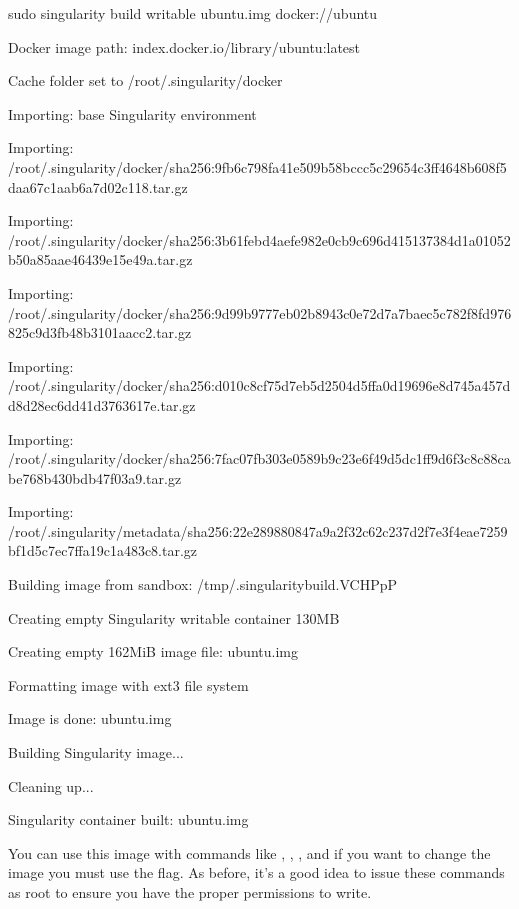 \documentclass[letterpaper,10pt,english]{sphinxmanual}
\begin{document}
%
\begin{sphinxVerbatim}[commandchars=\\\{\}]
\PYGZdl{} sudo singularity build \PYGZhy{}\PYGZhy{}writable ubuntu.img docker://ubuntu

Docker image path: index.docker.io/library/ubuntu:latest

Cache folder set to /root/.singularity/docker

Importing: base Singularity environment

Importing: /root/.singularity/docker/sha256:9fb6c798fa41e509b58bccc5c29654c3ff4648b608f5daa67c1aab6a7d02c118.tar.gz

Importing: /root/.singularity/docker/sha256:3b61febd4aefe982e0cb9c696d415137384d1a01052b50a85aae46439e15e49a.tar.gz

Importing: /root/.singularity/docker/sha256:9d99b9777eb02b8943c0e72d7a7baec5c782f8fd976825c9d3fb48b3101aacc2.tar.gz

Importing: /root/.singularity/docker/sha256:d010c8cf75d7eb5d2504d5ffa0d19696e8d745a457dd8d28ec6dd41d3763617e.tar.gz

Importing: /root/.singularity/docker/sha256:7fac07fb303e0589b9c23e6f49d5dc1ff9d6f3c8c88cabe768b430bdb47f03a9.tar.gz

Importing: /root/.singularity/metadata/sha256:22e289880847a9a2f32c62c237d2f7e3f4eae7259bf1d5c7ec7ffa19c1a483c8.tar.gz

Building image from sandbox: /tmp/.singularity\PYGZhy{}build.VCHPpP

Creating empty Singularity writable container 130MB

Creating empty 162MiB image file: ubuntu.img

Formatting image with ext3 file system

Image is done: ubuntu.img

Building Singularity image...


Cleaning up...


Singularity container built: ubuntu.img
\end{sphinxVerbatim}

You can use this image with commands like ,  ,  , and if you want to
change the image you must use the  flag. As before, it’s a good idea to
issue these commands as root to ensure you have the proper permissions
to write.
\end{document}
